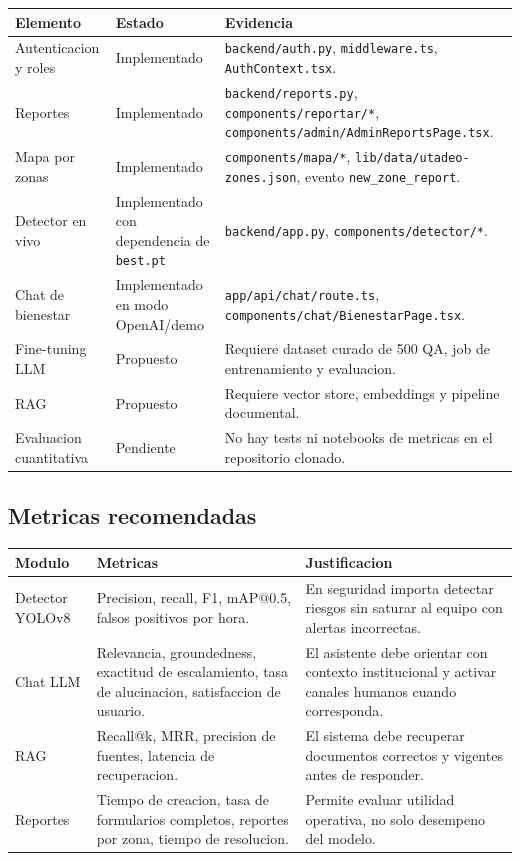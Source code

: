 \documentclass[11pt,letterpaper]{article}
\begin{document}
\begin{tabularx}{\textwidth}{P{3.2cm}P{3.2cm}Y}
    \toprule
    \textbf{Elemento} & \textbf{Estado} & \textbf{Evidencia} \\
    \midrule
    Autenticacion y roles & Implementado & \texttt{backend/auth.py}, \texttt{middleware.ts}, \texttt{AuthContext.tsx}. \\
    Reportes & Implementado & \texttt{backend/reports.py}, \texttt{components/reportar/*}, \texttt{components/admin/AdminReportsPage.tsx}. \\
    Mapa por zonas & Implementado & \texttt{components/mapa/*}, \texttt{lib/data/utadeo-zones.json}, evento \texttt{new\_zone\_report}. \\
    Detector en vivo & Implementado con dependencia de \texttt{best.pt} & \texttt{backend/app.py}, \texttt{components/detector/*}. \\
    Chat de bienestar & Implementado en modo OpenAI/demo & \texttt{app/api/chat/route.ts}, \texttt{components/chat/BienestarPage.tsx}. \\
    Fine-tuning LLM & Propuesto & Requiere dataset curado de 500 QA, job de entrenamiento y evaluacion. \\
    RAG & Propuesto & Requiere vector store, embeddings y pipeline documental. \\
    Evaluacion cuantitativa & Pendiente & No hay tests ni notebooks de metricas en el repositorio clonado. \\
    \bottomrule
\end{tabularx}

\subsection{Metricas recomendadas}

\begin{tabularx}{\textwidth}{P{3.4cm}P{4.3cm}Y}
    \toprule
    \textbf{Modulo} & \textbf{Metricas} & \textbf{Justificacion} \\
    \midrule
    Detector YOLOv8 & Precision, recall, F1, mAP@0.5, falsos positivos por hora. & En seguridad importa detectar riesgos sin saturar al equipo con alertas incorrectas. \\
    Chat LLM & Relevancia, groundedness, exactitud de escalamiento, tasa de alucinacion, satisfaccion de usuario. & El asistente debe orientar con contexto institucional y activar canales humanos cuando corresponda. \\
    RAG & Recall@k, MRR, precision de fuentes, latencia de recuperacion. & El sistema debe recuperar documentos correctos y vigentes antes de responder. \\
    Reportes & Tiempo de creacion, tasa de formularios completos, reportes por zona, tiempo de resolucion. & Permite evaluar utilidad operativa, no solo desempeno del modelo. \\
    \bottomrule
\end{tabularx}
\end{document}
